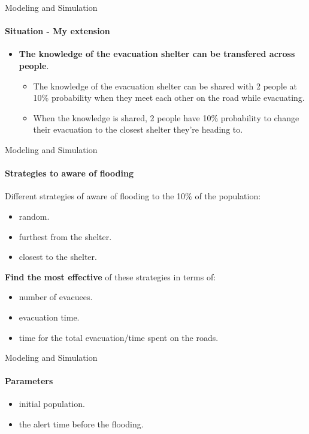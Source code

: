 \documentclass{beamer}
\begin{document}
\begin{frame}[fragile]{Modeling and Simulation}
\framesubtitle{Situation - My extension}
\begin{itemize}
\item \textbf{The knowledge of the evacuation shelter can be transfered across people}.
\begin{itemize}
    \item The knowledge of the evacuation shelter can be shared with 2 people at 10\% probability when they meet each other on the road while evacuating.
    \item When the knowledge is shared, 2 people have 10\% probability to change their evacuation to the closest shelter they're heading to.
\end{itemize}
\end{itemize}
\end{frame}

\begin{frame}[fragile]{Modeling and Simulation}
\framesubtitle{Strategies to aware of flooding}

Different strategies of aware of flooding to the 10\% of the population:
\begin{itemize}
    \item random.
    \item furthest from the shelter.
    \item closest to the shelter.
\end{itemize}

\textbf{Find the most effective} of these strategies in terms of:
\begin{itemize}
    \item number of evacuees.
    \item evacuation time.
    \item time for the total evacuation/time spent on the roads.
\end{itemize}
\end{frame}


\begin{frame}[fragile]{Modeling and Simulation}
\framesubtitle{Parameters}

\begin{itemize}
    \item initial population.
    \item the alert time before the flooding.
\end{itemize}

\end{frame}
\end{document}
